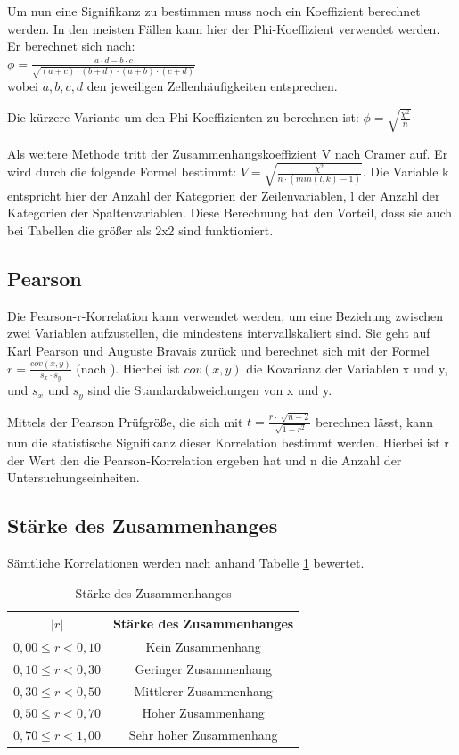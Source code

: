 Um nun eine Signifikanz zu bestimmen muss noch ein Koeffizient berechnet werden. In den meisten Fällen kann hier der Phi-Koeffizient verwendet werden. Er berechnet sich nach:\\
$\phi = \frac{a \cdot d - b \cdot c}{\sqrt{(a+c) \cdot (b+d) \cdot (a+b) \cdot (c+d)}}$\\
wobei $a, b, c, d$ den jeweiligen Zellenhäufigkeiten entsprechen.

Die kürzere Variante um den Phi-Koeffizienten zu berechnen ist: $\phi = \sqrt{\frac{\chi^2}{n}}$

Als weitere Methode tritt der Zusammenhangskoeffizient V nach Cramer auf. Er wird durch die folgende Formel bestimmt: $V = \sqrt{\frac{\chi^2}{n \cdot (min(l,k) - 1)}}$. Die Variable k entspricht hier der Anzahl der Kategorien der Zeilenvariablen, l der Anzahl der Kategorien der Spaltenvariablen. Diese Berechnung hat den Vorteil, dass sie auch bei Tabellen die größer als 2x2 sind funktioniert.

\subsection{Pearson}
\label{pearson}
Die Pearson-r-Korrelation kann verwendet werden, um eine Beziehung zwischen zwei Variablen aufzustellen, die mindestens intervallskaliert sind. Sie geht auf Karl Pearson und Auguste Bravais zurück und berechnet sich mit der Formel $r = \frac{cov(x,y)}{s_x \cdot s_y}$ (nach \citet{statistikeinfuehrung}). Hierbei ist $cov(x,y)$ die Kovarianz der Variablen x und y, und $s_x$ und $s_y$ sind die Standardabweichungen von x und y.

Mittels der Pearson Prüfgröße, die sich mit $t = \frac{r \cdot \sqrt[]{n - 2}}{\sqrt[]{1 - r^2}}$ berechnen lässt, kann nun die statistische Signifikanz dieser Korrelation bestimmt werden. Hierbei ist r der Wert den die Pearson-Korrelation ergeben hat und n die Anzahl der Untersuchungseinheiten.

\subsection{Stärke des Zusammenhanges}
Sämtliche Korrelationen werden nach \citet{statistikeinfuehrung} anhand Tabelle \ref{correlationrelevance} bewertet.

\begin{table}
	\begin{tabular}[]{ c | c }
	$|r|$ & Stärke des Zusammenhanges\\\hline\hline
	$0,00 \leq r < 0,10$ & Kein Zusammenhang\\\hline
	$0,10 \leq r < 0,30$ & Geringer Zusammenhang\\\hline
	$0,30 \leq r < 0,50$ & Mittlerer Zusammenhang\\\hline
	$0,50 \leq r < 0,70$ & Hoher Zusammenhang\\\hline
	$0,70 \leq r < 1,00$ & Sehr hoher Zusammenhang\\\hline
	\end{tabular}
	\caption{Stärke des Zusammenhanges}\label{correlationrelevance}
\end{table}

